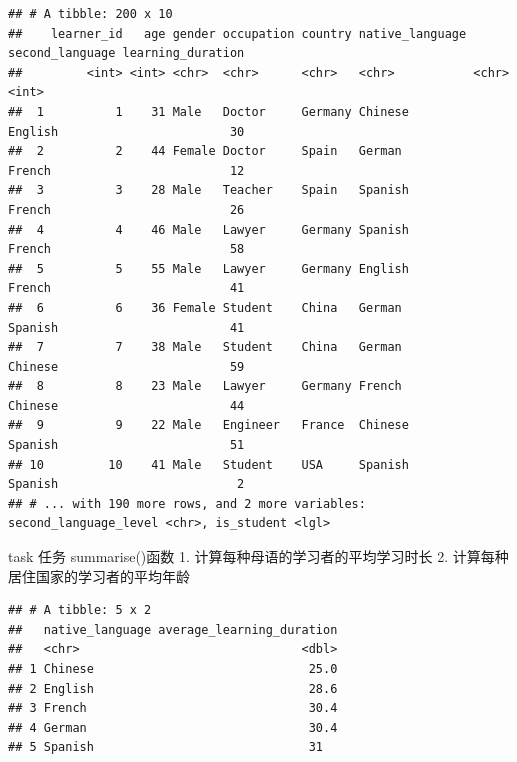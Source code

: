 \documentclass[]{book}
\newenvironment{Shaded}{\begin{snugshade}}{\end{snugshade}}
\newcommand{\CommentTok}[1]{\textcolor[rgb]{0.56,0.35,0.01}{\textit{#1}}}
\newcommand{\DataTypeTok}[1]{\textcolor[rgb]{0.13,0.29,0.53}{#1}}
\newcommand{\DecValTok}[1]{\textcolor[rgb]{0.00,0.00,0.81}{#1}}
\newcommand{\KeywordTok}[1]{\textcolor[rgb]{0.13,0.29,0.53}{\textbf{#1}}}
\newcommand{\NormalTok}[1]{#1}
\newcommand{\OperatorTok}[1]{\textcolor[rgb]{0.81,0.36,0.00}{\textbf{#1}}}
\newcommand{\StringTok}[1]{\textcolor[rgb]{0.31,0.60,0.02}{#1}}
\begin{document}
\begin{verbatim}
## # A tibble: 200 x 10
##    learner_id   age gender occupation country native_language second_language learning_duration
##         <int> <int> <chr>  <chr>      <chr>   <chr>           <chr>                       <int>
##  1          1    31 Male   Doctor     Germany Chinese         English                        30
##  2          2    44 Female Doctor     Spain   German          French                         12
##  3          3    28 Male   Teacher    Spain   Spanish         French                         26
##  4          4    46 Male   Lawyer     Germany Spanish         French                         58
##  5          5    55 Male   Lawyer     Germany English         French                         41
##  6          6    36 Female Student    China   German          Spanish                        41
##  7          7    38 Male   Student    China   German          Chinese                        59
##  8          8    23 Male   Lawyer     Germany French          Chinese                        44
##  9          9    22 Male   Engineer   France  Chinese         Spanish                        51
## 10         10    41 Male   Student    USA     Spanish         Spanish                         2
## # ... with 190 more rows, and 2 more variables: second_language_level <chr>, is_student <lgl>
\end{verbatim}

\begin{infobox}task
任务
summarise()函数
1. 计算每种母语的学习者的平均学习时长
2. 计算每种居住国家的学习者的平均年龄

\end{infobox}

\begin{Shaded}
\end{Shaded}

\begin{verbatim}
## # A tibble: 5 x 2
##   native_language average_learning_duration
##   <chr>                               <dbl>
## 1 Chinese                              25.0
## 2 English                              28.6
## 3 French                               30.4
## 4 German                               30.4
## 5 Spanish                              31
\end{verbatim}
\end{document}
